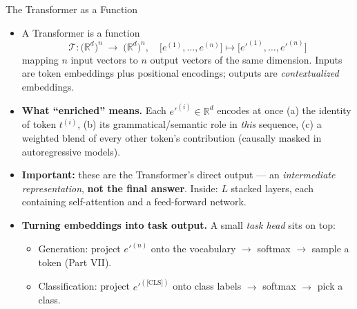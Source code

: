 \begin{frame}{The Transformer as a Function}
\begin{itemize}
\item A Transformer is a function
\[
   \mathcal{T}\colon \bigl(\mathbb{R}^{d}\bigr)^{n} \;\longrightarrow\; \bigl(\mathbb{R}^{d}\bigr)^{n},
   \quad \bigl[e^{(1)}, \ldots, e^{(n)}\bigr] \mapsto \bigl[e'^{(1)}, \ldots, e'^{(n)}\bigr]
\]
mapping $n$ input vectors to $n$ output vectors of the same dimension. Inputs are token embeddings plus positional encodings; outputs are \emph{contextualized} embeddings.

\medskip
\item \textbf{What ``enriched'' means.} Each $e'^{(i)} \in \mathbb{R}^{d}$ encodes at once (a) the identity of token $t^{(i)}$, (b) its grammatical/semantic role in \emph{this} sequence, (c) a weighted blend of every other token's contribution (causally masked in autoregressive models).

\medskip
\item \textbf{Important:} these are the Transformer's direct output --- an \emph{intermediate representation}, \textbf{not the final answer}. Inside: $L$ stacked layers, each containing self-attention and a feed-forward network.

\medskip
\item \textbf{Turning embeddings into task output.} A small \emph{task head} sits on top:
\begin{itemize}
    \item Generation: project $e'^{(n)}$ onto the vocabulary $\to$ softmax $\to$ sample a token (Part VII).
    \item Classification: project $e'^{(\text{[CLS]})}$ onto class labels $\to$ softmax $\to$ pick a class.
\end{itemize}
\end{itemize}
\end{frame}

